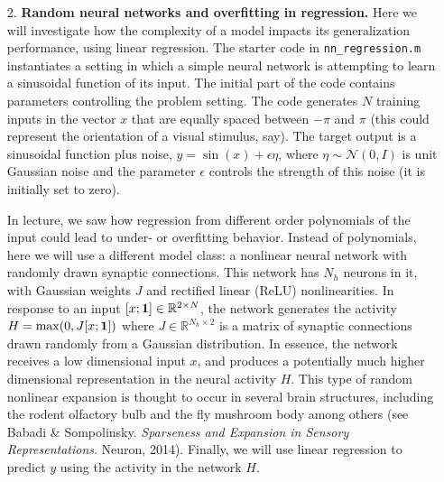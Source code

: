 \documentclass{article}
\begin{document}
\begin{itemize}
\item[2.] \textbf{Random neural networks and overfitting in regression.} 
Here we will investigate how the complexity of a model impacts its generalization performance, using linear regression. The starter code in \verb|nn_regression.m| instantiates a setting in which a simple neural network is attempting to learn a sinusoidal function of its input. The initial part of the code contains parameters controlling the problem setting. The code generates $N$ training inputs in the vector $x$ that are equally spaced between $-\pi$ and $\pi$ (this could represent the orientation of a visual stimulus, say). The target output is a sinusoidal function plus noise, $y=\sin(x)+\epsilon \eta$, where $\eta \sim \mathcal{N}(0,I)$ is unit Gaussian noise and the parameter $\epsilon$ controls the strength of this noise (it is initially set to zero). 

In lecture, we saw how regression from different order polynomials of the input could lead to under- or overfitting behavior. Instead of polynomials, here we will use a different model class: a nonlinear neural network with randomly drawn synaptic connections. This network has $N_h$ neurons in it, with Gaussian weights $J$ and rectified linear (ReLU) nonlinearities. In response to an input $[x; {\bf 1}]\in\mathbb{R}^{2\times N}$, the network generates the activity $H=\max(0,J[x;{\bf 1}])$ where $J\in\mathbb{R}^{N_h\times2}$ is a matrix of synaptic connections drawn randomly from a Gaussian distribution.  In essence, the network receives a low dimensional input $x$, and produces a potentially much higher dimensional representation in the neural activity $H$. This type of random nonlinear expansion is thought to occur in several brain structures, including the rodent olfactory bulb and the fly mushroom body among others (see Babadi \& Sompolinsky. \textit{Sparseness and Expansion in Sensory Representations}. Neuron, 2014). Finally, we will use linear regression to predict $y$ using the activity in the network $H$.


\end{itemize}
\end{document}
